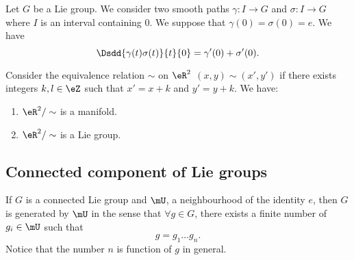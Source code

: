 \begin{proposition}     \label{PROPooAXYRooWVhXRa}
	Let \( G\) be a Lie group. We consider two smooth paths \( \gamma\colon I\to G\) and \( \sigma\colon I\to G\) where \( I\) is an interval containing \( 0\). We suppose that \( \gamma(0)=\sigma(0)=e\). We have
	\begin{equation}
		\Dsdd{ \gamma(t)\sigma(t) }{t}{0}=\gamma'(0)+\sigma'(0).
	\end{equation}
\end{proposition}

\begin{proposition}[\( 2\)-torus]       \label{PROPooSBVCooOZnszF}
	Consider the equivalence relation \( \sim\) on \( \eR^2\) \( (x,y)\sim(x',y')\) if there exists integers \( k,l\in \eZ\) such that \( x'=x+k\) and \( y'=y+k\). We have:
	\begin{enumerate}
		\item
		      \( \eR^2/\sim\) is a manifold.
		\item
		      \( \eR^2/\sim\) is a Lie group.
	\end{enumerate}
\end{proposition}
\subsection{Connected component of Lie groups}

\begin{proposition}		\label{PropUssGpGenere}
	If $G$ is a connected Lie group and $\mU$, a neighbourhood of the identity $e$, then $G$ is generated by $\mU$ in the sense that $\forall g\in G$, there exists a finite number of $g_{i}\in \mU$ such that
	\begin{equation}
		g=g_1\ldots g_n.
	\end{equation}
	Notice that the number $n$ is function of $g$ in general.
\end{proposition}

